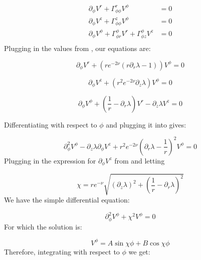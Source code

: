 \documentclass[12pt]{article}
\begin{document}
\begin{appendices}
\begin{equation}
\begin{aligned}
\partial_{\phi}V^{r}+\Gamma^{r}_{\phi\phi}V^{\phi}&=0\\
\partial_{\phi}V^{z}+\Gamma^{z}_{\phi\phi}V^{\phi}&=0\\
\partial_{\phi}V^{\phi}+\Gamma^{\phi}_{\phi r}V^{r}+\Gamma^{\phi}_{\phi z}V^{z}&=0\\
\end{aligned}
\end{equation}
Plugging in the values from , our equations are: 

\begin{equation}
\partial_{\phi}V^{r}+\left(re^{-2\nu}\left(r\partial_{r}\lambda-1\right)\right)V^{\phi}=0\label{eq:V-r-phi}
\end{equation}

\begin{equation}
\label{eq:V_z-V_phi}
\partial_{\phi}V^{z}+\left(r^{2}e^{-2\nu}\partial_{z}\lambda\right)V^{\phi}=0
\end{equation}

\begin{equation}
\partial_{\phi}V^{\phi}+\left(\frac{1}{r}-\partial_{r}\lambda\right)V^{r}-\partial_{z}\lambda V^{z}=0\label{eq:V-phi-r-z}
\end{equation}

Differentiating  with respect to $\phi$ and plugging it into  gives:

\begin{equation}
\partial^{2}_{\phi}V^{\phi}-\partial_z\lambda\partial_{\phi}V^z+r^{2}e^{-2\nu}\left(\partial_r\lambda-\frac{1}{r}\right)^2V^{\phi}=0
\end{equation}
Plugging in the expression for $\partial_{\phi}V^z$ from
 and letting 

\begin{equation}
\label{eq:def-chi}
\chi=re^{-\nu}\sqrt{\left(\partial_z\lambda\right)^2+\left(\frac{1}{r}-\partial_r\lambda\right)^2}
\end{equation}
We have the simple differential equation:

\begin{equation}
\partial^2_\phi V^\phi+\chi^2 V^\phi=0
\end{equation}
For which the solution is:

\begin{equation}
V^{\phi}=A\sin\chi\phi+B\cos\chi\phi
\end{equation}
Therefore, integrating  with respect to $\phi$ we get:


\end{appendices}
\end{document}
